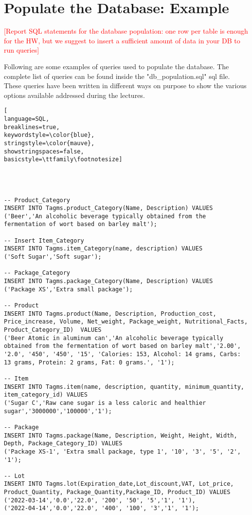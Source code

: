 
\section{Populate the Database: Example}
\textcolor{red}{[Report SQL statements for the database population: one row per table is enough for the HW, but we suggest to insert a sufficient amount of data in your DB to run queries]}

Following are some examples of queries used to populate the database. The complete list of queries can be found inside the "db\_population.sql" sql file. These queries have been written in different ways on purpose to show the various options available addressed during the lectures.


\begin{lstlisting}[
language=SQL,
breaklines=true,
keywordstyle=\color{blue},
stringstyle=\color{mauve},
showstringspaces=false,
basicstyle=\ttfamily\footnotesize]




-- Product_Category
INSERT INTO Tagms.product_Category(Name, Description) VALUES
('Beer','An alcoholic beverage typically obtained from the fermentation of wort based on barley malt');

-- Insert Item_Category
INSERT INTO Tagms.item_Category(name, description) VALUES
('Soft Sugar','Soft sugar');

-- Package_Category
INSERT INTO Tagms.package_Category(Name, Description) VALUES
('Package XS','Extra small package');

-- Product
INSERT INTO Tagms.product(Name, Description, Production_cost, Price_increase, Volume, Net_weight, Package_weight, Nutritional_Facts, Product_Category_ID)  VALUES
('Beer Atomic in aluminum can','An alcoholic beverage typically obtained from the fermentation of wort based on barley malt','2.00', '2.0', '450', '450', '15', 'Calories: 153, Alcohol: 14 grams, Carbs: 13 grams, Protein: 2 grams, Fat: 0 grams.', '1');

-- Item
INSERT INTO Tagms.item(name, description, quantity, minimum_quantity, item_category_id) VALUES
('Sugar C','Raw cane sugar is a less caloric and healthier sugar','3000000','100000','1');

-- Package
INSERT INTO Tagms.package(Name, Description, Weight, Height, Width, Depth, Package_Category_ID) VALUES
('Package XS-1', 'Extra small package, type 1', '10', '3', '5', '2', '1');

-- Lot
INSERT INTO Tagms.lot(Expiration_date,Lot_discount,VAT, Lot_price, Product_Quantity, Package_Quantity,Package_ID, Product_ID) VALUES
('2022-03-14','0.0','22.0', '200', '50', '5','1', '1'),
('2022-04-14','0.0','22.0', '400', '100', '3','1', '1');


\end{lstlisting}
